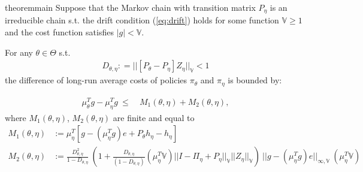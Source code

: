 \documentclass[11pt]{article}
\newcommand{\V}{\mathbb{V}}
\newtheorem{theorem}{Theorem}
\theoremstyle{definition}
\numberwithin{equation}{section}
\begin{document}
\begin{restatable}{theorem}{main}
\label{thm:main}
Suppose that the Markov chain with transition matrix $P_{\eta}$ is  an irreducible  chain s.t. the drift condition (\ref{eq:drift}) holds for some function $\V\geq1$ and the cost function satisfies $|g|<\V$. 

 For any $\theta\in \Theta$ s.t. 
\begin{align*} 
 D_{\theta,\eta} : = ||  [P_{\theta} - P_{\eta}] Z_{\eta}||_\V < 1
\end{align*}
the difference of long-run average costs of policies $\pi_\theta$ and $\pi_{\eta}$ is bounded by:



   \begin{align}\label{eq:ineq2}
\mu_\theta^Tg- \mu_\eta^Tg ~\leq~ &M_1(\theta, \eta)+  M_2(\theta, \eta),
\end{align}  
where $M_1(\theta, \eta)$, $M_2(\theta, \eta)$ are finite and equal to 
\begin{align*}
M_1(\theta, \eta) &:= \mu_{\eta}^T[ g -(\mu_\eta^Tg) e   +P_{\theta}h_{\eta} - h_{\eta} ]  \\
M_2(\theta, \eta) &:=\frac{ D_{\theta,\eta}^2}{1- D_{\theta, \eta}} ~  \left( 1+  \frac{ D_{\theta,\eta}}{(1- D_{\theta,\eta})}  (\mu_{\eta}^T\V) ||I - \Pi_\eta +P_\eta||_\V ||Z_{\eta}||_\V  \right)~|| g - (\mu_\eta^Tg) e  ||_{\infty, \V}~(\mu_{\eta}^T\V)
\end{align*}
\end{restatable}



%
%
%
%
%
% 
\end{document}
